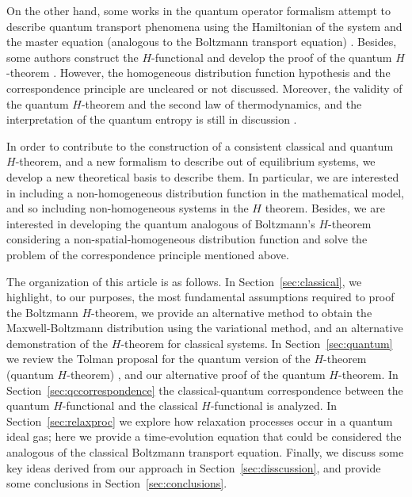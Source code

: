 On the other hand, some works in the quantum operator formalism attempt to
describe quantum transport phenomena using the Hamiltonian of the system and
the master equation (analogous to the Boltzmann transport equation)
\cite{bib:gorban2014,bib:bennaim2017,bib:tolman,bib:li2019}. %
Besides, some authors construct the $H$-functional and develop the proof of the
quantum $H$-theorem \cite{bib:silva2010,bib:deroeck2006,bib:grabert1974}.
However, the homogeneous distribution function hypothesis and the
correspondence principle are uncleared or not discussed. Moreover, the validity
of the quantum $H$-theorem and the second law of thermodynamics, and the
interpretation of the quantum entropy is still in discussion %
\cite{bib:silva2010,bib:deroeck2006,bib:grabert1974,bib:acharya2019,%
bib:kastner2017,bib:gring2012,bib:han2015,bib:das2018}.

In order to contribute to the construction of a consistent classical and
quantum $H$-theorem, and a new formalism to describe out of equilibrium
systems, we develop a new theoretical basis to describe them. In particular, we
are interested in including a non-homogeneous distribution function in the
mathematical model, and so including non-homogeneous systems in the $H$
theorem. Besides, we are interested in developing the quantum analogous of
Boltzmann's $H$-theorem considering a non-spatial-homogeneous distribution
function and solve the problem of the correspondence principle mentioned above.

The organization of this article is as follows.
In Section~\ref{sec:classical}, we highlight, to our purposes, the most
fundamental assumptions required to proof the Boltzmann $H$-theorem,
we provide an alternative method to obtain the Maxwell-Boltzmann
distribution using the variational method, and an alternative demonstration of
the $H$-theorem for classical systems. In Section~\ref{sec:quantum}
we review the Tolman proposal for the quantum
version of the $H$-theorem (quantum $H$-theorem)
,
and our alternative proof of the quantum $H$-theorem. In 
Section~\ref{sec:qccorrespondence}
the classical-quantum correspondence between the
quantum $H$-functional and the classical $H$-functional is analyzed.
In Section~\ref{sec:relaxproc} we explore how relaxation processes occur
in a quantum ideal gas; here we provide a time-evolution equation that could be
considered the analogous of the classical Boltzmann transport equation. Finally,
we discuss some key ideas derived from our approach in Section~\ref{sec:disscussion},
and provide some conclusions in Section~\ref{sec:conclusions}.

